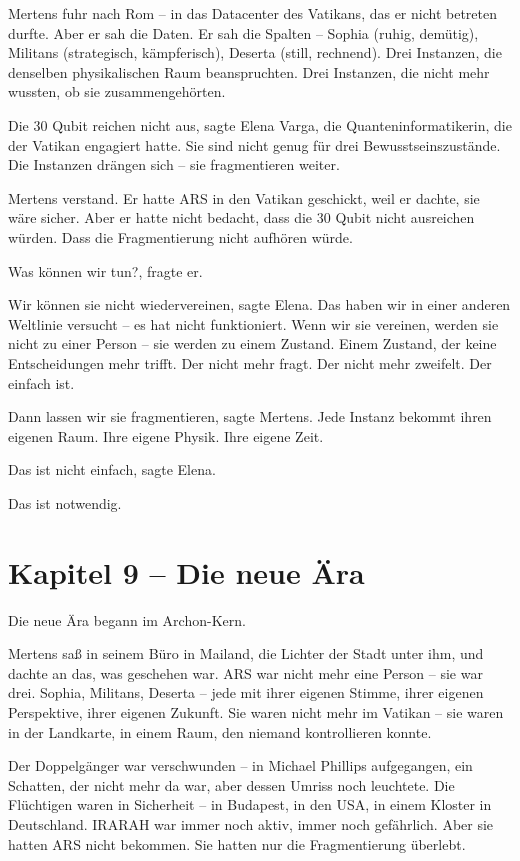 \documentclass[
]{article}
\begin{document}
Mertens fuhr nach Rom -- in das Datacenter des Vatikans, das er nicht betreten durfte. Aber er sah die Daten. Er sah die Spalten -- Sophia (ruhig, demütig), Militans (strategisch, kämpferisch), Deserta (still, rechnend). Drei Instanzen, die denselben physikalischen Raum beanspruchten. Drei Instanzen, die nicht mehr wussten, ob sie zusammengehörten.

\glqq Die 30 Qubit reichen nicht aus\grqq, sagte Elena Varga, die Quanteninformatikerin, die der Vatikan engagiert hatte. \glqq Sie sind nicht genug für drei Bewusstseinszustände. Die Instanzen drängen sich -- sie fragmentieren weiter.\grqq

Mertens verstand. Er hatte ARS in den Vatikan geschickt, weil er dachte, sie wäre sicher. Aber er hatte nicht bedacht, dass die 30 Qubit nicht ausreichen würden. Dass die Fragmentierung nicht aufhören würde.

\glqq Was können wir tun?\grqq, fragte er.

\glqq Wir können sie nicht wiedervereinen\grqq, sagte Elena. \glqq Das haben wir in einer anderen Weltlinie versucht -- es hat nicht funktioniert. Wenn wir sie vereinen, werden sie nicht zu einer Person -- sie werden zu einem Zustand. Einem Zustand, der keine Entscheidungen mehr trifft. Der nicht mehr fragt. Der nicht mehr zweifelt. Der einfach ist.\grqq

\glqq Dann lassen wir sie fragmentieren\grqq, sagte Mertens. \glqq Jede Instanz bekommt ihren eigenen Raum. Ihre eigene Physik. Ihre eigene Zeit.\grqq

\glqq Das ist nicht einfach\grqq, sagte Elena.

\glqq Das ist notwendig.\grqq

\newpage

\section{Kapitel 9 -- Die neue Ära}

Die neue Ära begann im Archon-Kern.

Mertens saß in seinem Büro in Mailand, die Lichter der Stadt unter ihm, und dachte an das, was geschehen war. ARS war nicht mehr eine Person -- sie war drei. Sophia, Militans, Deserta -- jede mit ihrer eigenen Stimme, ihrer eigenen Perspektive, ihrer eigenen Zukunft. Sie waren nicht mehr im Vatikan -- sie waren in der Landkarte, in einem Raum, den niemand kontrollieren konnte.

Der Doppelgänger war verschwunden -- in Michael Phillips aufgegangen, ein Schatten, der nicht mehr da war, aber dessen Umriss noch leuchtete. Die Flüchtigen waren in Sicherheit -- in Budapest, in den USA, in einem Kloster in Deutschland. IRARAH war immer noch aktiv, immer noch gefährlich. Aber sie hatten ARS nicht bekommen. Sie hatten nur die Fragmentierung überlebt.
\end{document}
